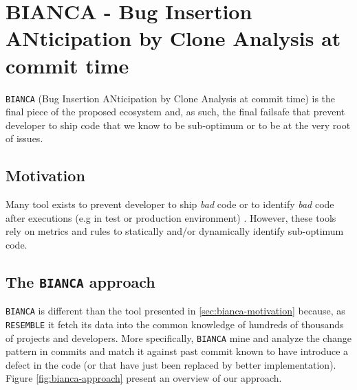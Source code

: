 
\section{BIANCA - Bug Insertion ANticipation by Clone Analysis at commit time\label{sec:BIANCA}}

{\tt BIANCA} (Bug Insertion ANticipation by Clone Analysis at commit time) is the final piece of the proposed ecosystem and, as such, the final failsafe that prevent developer to ship code that we know to be sub-optimum or to be at the very root of issues.

\subsection{Motivation\label{sec:bianca-motivation}}

Many tool exists to prevent developer to ship {\it bad} code \cite{Dangel2000,Hovemeyer2007,Moha2010} or to identify {\it bad} code after executions (e.g in test or production environment) \cite{Nayrolles,Nayrolles2013a}. 
However, these tools rely on metrics and rules to statically and/or dynamically identify sub-optimum code. 

\subsection{The {\tt BIANCA} approach\label{sec:bianca-approach}}

{\tt BIANCA} is different than the tool presented in \ref{sec:bianca-motivation} because, as {\tt RESEMBLE} it fetch its data into the common knowledge of hundreds of thousands of projects and developers. 
More specifically, {\tt BIANCA} mine and analyze the change pattern in commits and match it against past commit known to have introduce a defect in the code (or that have just been replaced by better implementation). Figure \ref{fig:bianca-approach} present an overview of our approach.

